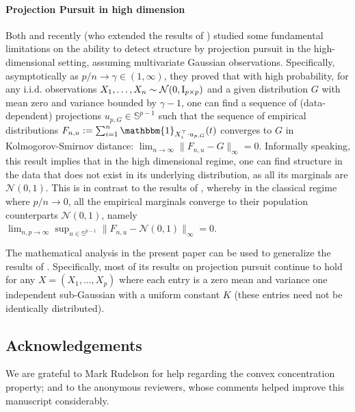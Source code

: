 \documentclass[times,sort&compress,3p]{elsarticle}
\newcommand{\Revision}[1]{{#1}}
\begin{document}
\paragraph{Projection Pursuit in high dimension}
Both \cite{bickel2018projection} and recently \cite{Montanari2022OverparametrizedLD} (who extended the results of \cite{bickel2018projection}) 
studied
some fundamental limitations 
on the ability to detect structure by projection pursuit in the high-dimensional setting, assuming multivariate Gaussian observations. 
Specifically, asymptotically as $p/n \to \gamma \in (1,\infty)$, they proved that with high probability, for any i.i.d. observations $X_1,\ldots,X_n \sim \mathcal{N}(0,\mathrm{I}_{p \times p})$ and a given distribution $G$ with mean zero and variance bounded by $\gamma -1$, one can find a sequence of (data-dependent) projections $u_{p,G} \in \mathbb{S}^{p-1}$ such that the sequence of empirical distributions
$F_{n,u} := \sum_{i=1}^{n}\mathbbm{1}_{X^{\top}_i \cdot u_{p,G}}(t)$
converges to $G$ in 
Kolmogorov-Smirnov distance:
$
        \lim_{n \to\infty} \|F_{n,u} - G\|_{\infty} = 0
$.
Informally speaking, this result implies that in the high dimensional regime, one can find structure in the data that does not exist in its underlying distribution, as all its marginals are $\mathcal{N}(0,1)$. This is in contrast to the results of \cite{Diaconis_Freedman}, whereby in the classical regime where $p/n \to 0$, all the empirical marginals converge to their population counterparts $\mathcal{N}(0,1)$, namely  
$
        \lim_{n,p \to\infty}\sup_{u \in \mathbb{S}^{p-1}} \|F_{n,u} - \mathcal{N}(0,1)\|_{\infty} = 0.
$

The mathematical analysis 
in the present paper can be used to generalize the results of \cite{bickel2018projection}. Specifically, most of its results 
on projection pursuit continue to hold for any $X =(X_1,\ldots,X_p)$ where each entry is a  zero mean and variance one independent sub-Gaussian with a uniform constant $K$ (these entries need not be identically distributed). 

\Revision{
\subsection*{Acknowledgements}

We are grateful to Mark Rudelson for help regarding the convex concentration property; and to the anonymous reviewers, whose comments helped improve this manuscript considerably.
}
\end{document}

